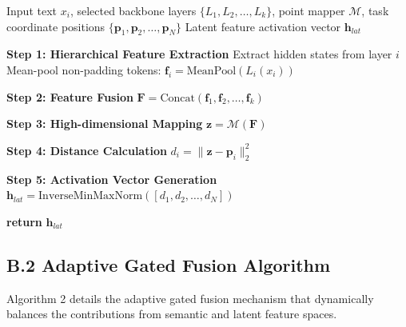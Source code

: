\documentclass[11pt]{article}
\begin{document}
\begin{algorithm}[h]
\caption{Task Latent Feature Abstraction Module}
\begin{algorithmic}[1]
\REQUIRE Input text $x_i$, selected backbone layers $\{L_1, L_2, \ldots, L_k\}$, point mapper $\mathcal{M}$, task coordinate positions $\{\mathbf{p}_1, \mathbf{p}_2, \ldots, \mathbf{p}_N\}$
\ENSURE Latent feature activation vector $\mathbf{h}_{lat}$

\STATE \textbf{Step 1: Hierarchical Feature Extraction}
    \STATE Extract hidden states from layer $i$
    \STATE Mean-pool non-padding tokens: $\mathbf{f}_i = \text{MeanPool}(L_i(x_i))$
\ENDFOR

\STATE \textbf{Step 2: Feature Fusion}
\STATE $\mathbf{F} = \text{Concat}(\mathbf{f}_1, \mathbf{f}_2, \ldots, \mathbf{f}_k)$

\STATE \textbf{Step 3: High-dimensional Mapping}
\STATE $\mathbf{z} = \mathcal{M}(\mathbf{F})$

\STATE \textbf{Step 4: Distance Calculation}
    \STATE $d_i = \|\mathbf{z} - \mathbf{p}_i\|_2^2$
\ENDFOR

\STATE \textbf{Step 5: Activation Vector Generation}
\STATE $\mathbf{h}_{lat} = \text{InverseMinMaxNorm}([d_1, d_2, \ldots, d_N])$

\STATE \textbf{return} $\mathbf{h}_{lat}$
\end{algorithmic}
\end{algorithm}

\subsection*{B.2 Adaptive Gated Fusion Algorithm}

Algorithm 2 details the adaptive gated fusion mechanism that dynamically balances the contributions from semantic and latent feature spaces.
\end{document}
